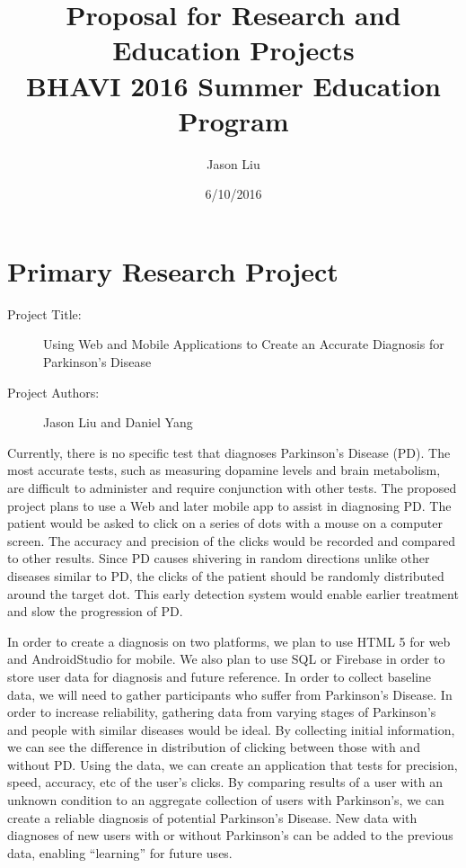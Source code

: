 \documentclass[12pt]{article}
\title{Proposal for Research and Education Projects\\
	 BHAVI 2016 Summer Education Program}
\author{Jason Liu}
\date{6/10/2016}
\begin{document}
\maketitle

\section{Primary Research Project}
	\begin{description}
		\item[Project Title:] Using Web and Mobile Applications to Create an Accurate Diagnosis for Parkinson's Disease
		\item[Project Authors:] Jason Liu and Daniel Yang
	\end{description}

	Currently, there is no specific test that diagnoses Parkinson’s Disease (PD). The most accurate tests, such as measuring dopamine levels and brain metabolism, are difficult to administer and require conjunction with other tests. The proposed project plans to use a Web and later mobile app to assist in diagnosing PD. The patient would be asked to click on a series of dots with a mouse on a computer screen. The accuracy and precision of the clicks would be recorded and compared to other results. Since PD causes shivering in random directions unlike other diseases similar to PD, the clicks of the patient should be randomly distributed around the target dot. This early detection system would enable earlier treatment and slow the progression of PD. 

	In order to create a diagnosis on two platforms, we plan to use HTML 5 for web and AndroidStudio for mobile. We also plan to use SQL or Firebase in order to store user data for diagnosis and future reference. In order to collect baseline data, we will need to gather participants who suffer from Parkinson’s Disease. In order to increase reliability, gathering data from varying stages of Parkinson’s and people with similar diseases would be ideal. By collecting initial information, we can see the difference in distribution of clicking between those with and without PD. Using the data, we can create an application that tests for precision, speed, accuracy, etc of the user’s clicks. By comparing results of a user with an unknown condition to an aggregate collection of users with Parkinson’s, we can create a reliable diagnosis of potential Parkinson’s Disease. New data with diagnoses of new users with or without Parkinson’s can be added to the previous data, enabling “learning” for future uses. 
\end{document}
